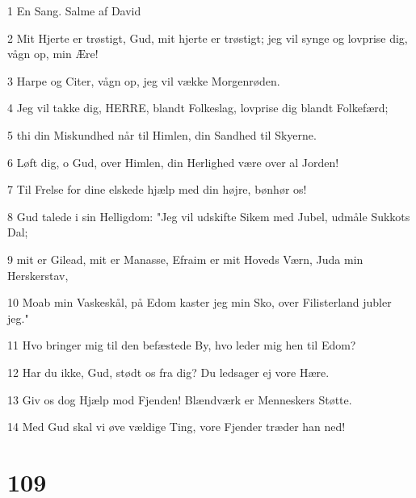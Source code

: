 \par 1 En Sang. Salme af David
\par 2 Mit Hjerte er trøstigt, Gud, mit hjerte er trøstigt; jeg vil synge og lovprise dig, vågn op, min Ære!
\par 3 Harpe og Citer, vågn op, jeg vil vække Morgenrøden.
\par 4 Jeg vil takke dig, HERRE, blandt Folkeslag, lovprise dig blandt Folkefærd;
\par 5 thi din Miskundhed når til Himlen, din Sandhed til Skyerne.
\par 6 Løft dig, o Gud, over Himlen, din Herlighed være over al Jorden!
\par 7 Til Frelse for dine elskede hjælp med din højre, bønhør os!
\par 8 Gud talede i sin Helligdom: "Jeg vil udskifte Sikem med Jubel, udmåle Sukkots Dal;
\par 9 mit er Gilead, mit er Manasse, Efraim er mit Hoveds Værn, Juda min Herskerstav,
\par 10 Moab min Vaskeskål, på Edom kaster jeg min Sko, over Filisterland jubler jeg."
\par 11 Hvo bringer mig til den befæstede By, hvo leder mig hen til Edom?
\par 12 Har du ikke, Gud, stødt os fra dig? Du ledsager ej vore Hære.
\par 13 Giv os dog Hjælp mod Fjenden! Blændværk er Menneskers Støtte.
\par 14 Med Gud skal vi øve vældige Ting, vore Fjender træder han ned!

\chapter{109}

